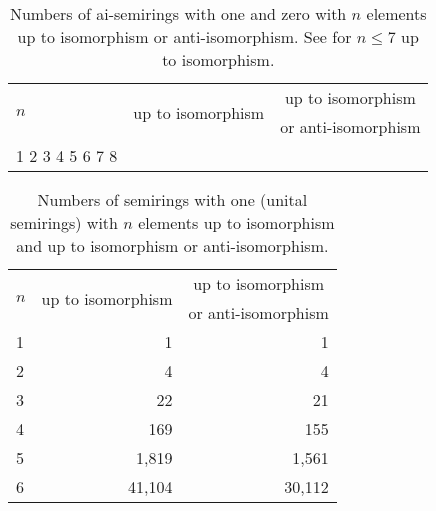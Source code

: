 \documentclass{article}
\theoremstyle{definition}
\theoremstyle{plain}
\begin{document}
\begin{table}[ht]
  \centering
  \begin{tabular}{l|r|r}
    \multirow{2}{*}{$n$} & \multicolumn{1}{|c|}{\multirow{2}{*}{up to
    isomorphism}} & \multicolumn{1}{c}{up to isomorphism} \\
    & & \multicolumn{1}{l}{or anti-isomorphism}\\
    \midrule
    1
    2
    3
    4
    5
    6
    7
    8
  \end{tabular}
  \caption{Numbers of ai-semirings with one and zero with $n$
    elements up
    to isomorphism or anti-isomorphism. See
  \cite{MSAiSemiringsWithOneAndZero} for \(n\leq7\) up to isomorphism.}
  \label{tab:ai-semirings-with-one-and-zero}
\end{table}

\begin{table}[h]
  \centering
  \begin{tabular}{l|r|r}
    \multirow{2}{*}{$n$} & \multicolumn{1}{|c|}{\multirow{2}{*}{up to
    isomorphism}} & \multicolumn{1}{c}{up to isomorphism} \\
    & & \multicolumn{1}{l}{or anti-isomorphism}\\
    \midrule
    1 & 1         & 1      \\
    2 & 4         & 4      \\
    3 & 22        & 21     \\
    4 & 169       & 155    \\
    5 & 1,819     & 1,561  \\
    6 & 41,104    & 30,112 \\
  \end{tabular}
  \caption{Numbers of semirings with one (unital semirings) with $n$
  elements up to isomorphism and up to isomorphism or anti-isomorphism.}
  \label{tab:unital-semirings}
\end{table}

\printbibliography
\end{document}
